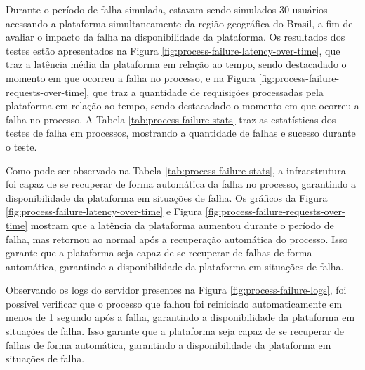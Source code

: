 Durante o período de falha simulada, estavam sendo simulados 30 usuários acessando a plataforma simultaneamente da região geográfica do Brasil, a fim de avaliar o impacto da falha na disponibilidade da plataforma. Os resultados dos testes estão apresentados na Figura \ref{fig:process-failure-latency-over-time}, que traz a latência média da plataforma em relação ao tempo, sendo destacadado o momento em que ocorreu a falha no processo, e na Figura \ref{fig:process-failure-requests-over-time}, que traz a quantidade de requisições processadas pela plataforma em relação ao tempo, sendo destacadado o momento em que ocorreu a falha no processo. A Tabela \ref{tab:process-failure-stats} traz as estatísticas dos testes de falha em processos, mostrando a quantidade de falhas e sucesso durante o teste.



Como pode ser observado na Tabela \ref{tab:process-failure-stats}, a infraestrutura foi capaz de se recuperar de forma automática da falha no processo, garantindo a disponibilidade da plataforma em situações de falha. Os gráficos da Figura \ref{fig:process-failure-latency-over-time} e Figura \ref{fig:process-failure-requests-over-time} mostram que a latência da plataforma aumentou durante o período de falha, mas retornou ao normal após a recuperação automática do processo. Isso garante que a plataforma seja capaz de se recuperar de falhas de forma automática, garantindo a disponibilidade da plataforma em situações de falha.

Observando os logs do servidor presentes na Figura \ref{fig:process-failure-logs}, foi possível verificar que o processo que falhou foi reiniciado automaticamente em menos de 1 segundo após a falha, garantindo a disponibilidade da plataforma em situações de falha. Isso garante que a plataforma seja capaz de se recuperar de falhas de forma automática, garantindo a disponibilidade da plataforma em situações de falha.

